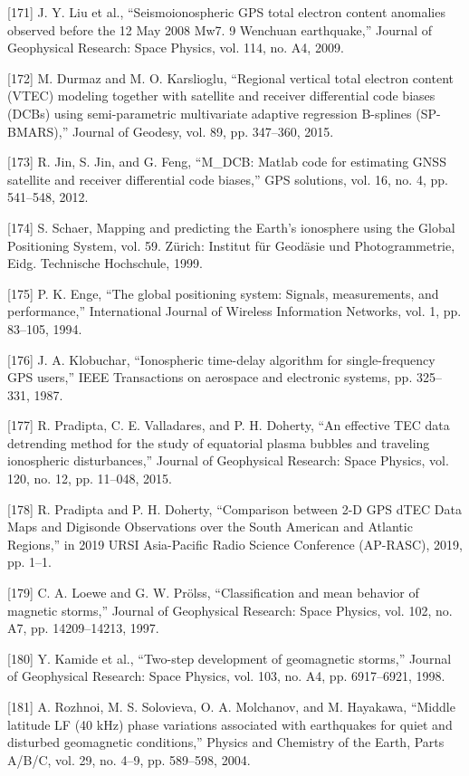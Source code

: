 \documentclass[sn-mathphys-num]{sn-jnl}%
\begin{document}
[171] J. Y. Liu et al., “Seismoionospheric GPS total electron content anomalies observed before the 12 May 2008 Mw7. 9 Wenchuan earthquake,” Journal of Geophysical Research: Space Physics, vol. 114, no. A4, 2009.

[172] M. Durmaz and M. O. Karslioglu, “Regional vertical total electron content (VTEC) modeling together with satellite and receiver differential code biases (DCBs) using semi-parametric multivariate adaptive regression B-splines (SP-BMARS),” Journal of Geodesy, vol. 89, pp. 347–360, 2015.

[173] R. Jin, S. Jin, and G. Feng, “M_DCB: Matlab code for estimating GNSS satellite and receiver differential code biases,” GPS solutions, vol. 16, no. 4, pp. 541–548, 2012.

[174] S. Schaer, Mapping and predicting the Earth’s ionosphere using the Global Positioning System, vol. 59. Zürich: Institut für Geodäsie und Photogrammetrie, Eidg. Technische Hochschule, 1999.

[175] P. K. Enge, “The global positioning system: Signals, measurements, and performance,” International Journal of Wireless Information Networks, vol. 1, pp. 83–105, 1994.

[176] J. A. Klobuchar, “Ionospheric time-delay algorithm for single-frequency GPS users,” IEEE Transactions on aerospace and electronic systems, pp. 325–331, 1987.

[177] R. Pradipta, C. E. Valladares, and P. H. Doherty, “An effective TEC data detrending method for the study of equatorial plasma bubbles and traveling ionospheric disturbances,” Journal of Geophysical Research: Space Physics, vol. 120, no. 12, pp. 11–048, 2015.

[178] R. Pradipta and P. H. Doherty, “Comparison between 2-D GPS dTEC Data Maps and Digisonde Observations over the South American and Atlantic Regions,” in 2019 URSI Asia-Pacific Radio Science Conference (AP-RASC), 2019, pp. 1–1.

[179] C. A. Loewe and G. W. Prölss, “Classification and mean behavior of magnetic storms,” Journal of Geophysical Research: Space Physics, vol. 102, no. A7, pp. 14209–14213, 1997.

[180] Y. Kamide et al., “Two-step development of geomagnetic storms,” Journal of Geophysical Research: Space Physics, vol. 103, no. A4, pp. 6917–6921, 1998.

[181] A. Rozhnoi, M. S. Solovieva, O. A. Molchanov, and M. Hayakawa, “Middle latitude LF (40 kHz) phase variations associated with earthquakes for quiet and disturbed geomagnetic conditions,” Physics and Chemistry of the Earth, Parts A/B/C, vol. 29, no. 4–9, pp. 589–598, 2004.
\end{document}
